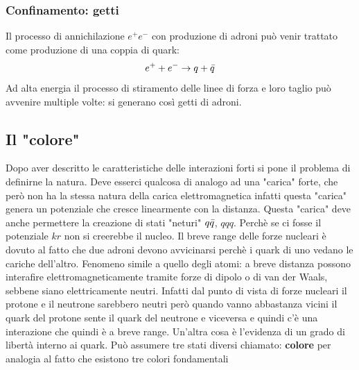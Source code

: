 \subsubsection{Confinamento: getti}
Il processo di annichilazione $e^+e^-$ con produzione di adroni può venir trattato come produzione di una coppia di quark:
\begin{equation*}
    e^++e^-\to q+\Bar{q}
\end{equation*}
Ad alta energia il processo di stiramento delle linee di forza e loro taglio può avvenire multiple volte: si generano così getti di adroni.
\subsection{Il "colore"}
Dopo aver descritto le caratteristiche delle interazioni forti si pone il problema di definirne la natura. Deve esserci qualcosa di analogo ad una "carica" forte, che però non ha la stessa natura della carica elettromagnetica infatti questa "carica" genera un potenziale che cresce linearmente con la distanza. Questa "carica" deve anche permettere la creazione di stati "neturi" $q\Bar{q}$, $qqq$. Perchè se ci fosse il potenziale $kr$ non si creerebbe il nucleo. Il breve range delle forze nucleari è dovuto al fatto che due adroni devono avvicinarsi perchè i quark di uno vedano le cariche dell'altro. Fenomeno simile a quello degli atomi: a breve distanza possono interafire elettromagneticamente tramite forze di dipolo o di van der Waals, sebbene siano elettricamente neutri. Infatti dal punto di vista di forze nucleari il protone e il neutrone sarebbero neutri però quando vanno abbastanza vicini il quark del protone sente il quark del neutrone e viceversa e quindi c'è una interazione che quindi è a breve range. 
Un'altra cosa è l'evidenza di un grado di libertà interno ai quark. Può assumere tre stati diversi chiamato: \textbf{colore} per analogia al fatto che esistono tre colori fondamentali
